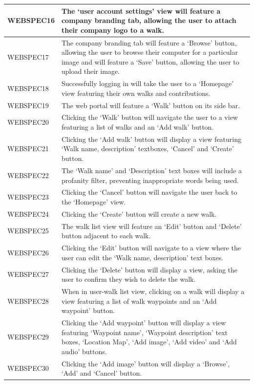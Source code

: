 \documentclass[11pt,a4paper]{article}
\begin{document}
\begin{longtable}{|p{2.5cm}p{13cm}|}
WEBSPEC16 & The `user account settings' view will feature a company branding tab, allowing the user to attach their company logo to a walk. \\ \hline
WEBSPEC17 & The company branding tab will feature a `Browse' button, allowing the user to browse their computer for a particular image and will feature a `Save' button, allowing the user to upload their image. \\ \hline
WEBSPEC18 & Successfully logging in will take the user to a `Homepage' view featuring their own walks and contributions. \\ \hline
WEBSPEC19 & The web portal will feature a `Walk' button on its side bar. \\ \hline
WEBSPEC20 & Clicking the `Walk' button will navigate the user to a view featuring a list of walks and an `Add walk' button. \\ \hline
WEBSPEC21 & Clicking the `Add walk' button will display a view featuring `Walk name, description' textboxes, `Cancel' and `Create' button. \\ \hline
WEBSPEC22 & The `Walk name' and `Description' text boxes will include a profanity filter, preventing inappropriate words being used. \\ \hline
WEBSPEC23 & Clicking the `Cancel' button will navigate the user back to the `Homepage' view. \\ \hline
WEBSPEC24 & Clicking the `Create' button will create a new walk. \\ \hline
WEBSPEC25 & The walk list view will feature an `Edit' button and `Delete' button adjacent to each walk. \\ \hline
WEBSPEC26 & Clicking the `Edit' button will navigate to a view where the user can edit the `Walk name, description' text boxes. \\ \hline
WEBSPEC27 & Clicking the `Delete' button will display a view, asking the user to confirm they wish to delete the walk. \\ \hline
WEBSPEC28 & When in user-walk list view, clicking on a walk will display a view featuring a list of walk waypoints and an `Add waypoint' button. \\ \hline
WEBSPEC29 & Clicking the `Add waypoint' button will display a view featuring `Waypoint name', `Waypoint description' text boxes, `Location Map', `Add image', `Add video' and `Add audio' buttons. \\ \hline
WEBSPEC30 & Clicking the `Add image' button will display a `Browse', `Add' and `Cancel' button. \\ \hline

\end{longtable}
\end{document}
